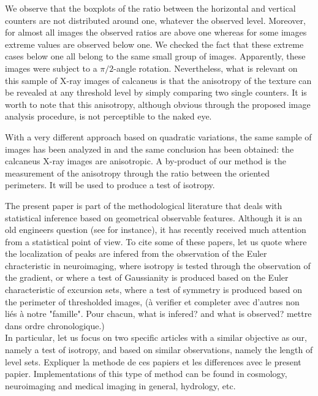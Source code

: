\documentclass[12pt]{article}
\theoremstyle{Theorem}
\theoremstyle{definition}
\begin{document}
We observe that the boxplots of the ratio between the horizontal and vertical counters are not distributed around one, whatever the observed level. 
Moreover, for almost all images the observed ratios are above one whereas for some images extreme values are observed below one. We checked the fact that these extreme cases below one all belong to the same small group of images. Apparently, these images were subject to a $\pi/2$-angle rotation. Nevertheless, what is relevant on this sample of X-ray images of calcaneus is that the anisotropy of the texture can be revealed at any threshold level by simply comparing two single counters. It is worth to note that this anisotropy, although obvious through the proposed image analysis procedure, is not perceptible to the naked eye. 

With a very different approach based on quadratic variations, the same sample of images has been analyzed in \cite{Richard??} and the same conclusion has been obtained: the calcaneus X-ray images are anisotropic. A by-product of our method is the measurement of the anisotropy through the ratio between the oriented perimeters. It will be used to produce a test of isotropy.

\bigskip

The present paper is part of the methodological literature that deals with statistical inference based on geometrical observable features. Although it is an old engineers question (see \cite{Longuet-Higgins} for instance), it has recently received much attention from a statistical point of view.  To cite some of these papers, let us quote \cite{Worsley96} where the localization of peaks are infered from the observation of the Euler chracteristic in neuroimaging, \cite{Molina} where isotropy is tested through the observation of the gradient, \cite{DEL17} or \cite{bierme2019} where a test of Gaussianity is produced based on the Euler characteristic of excursion sets, \cite{Psymetrie} where a test of symmetry is produced based on the perimeter of thresholded images,  ({\sc \`a verifier et completer avec d'autres non li\'es \`a notre "famille". Pour chacun, what is infered? and what is observed? mettre dans ordre chronologique.})\\
In particular, let us focus on two specific articles \cite{cabana1987affine, Berzin} with a similar objective as our, namely a test of isotropy, and based on similar observations, namely the length of level sets. {\sc Expliquer la methode de ces papiers et les differences avec le present papier}. Implementations of this type of method can be found in cosmology, neuroimaging and medical imaging in general, hydrology, etc. 
\end{document}
